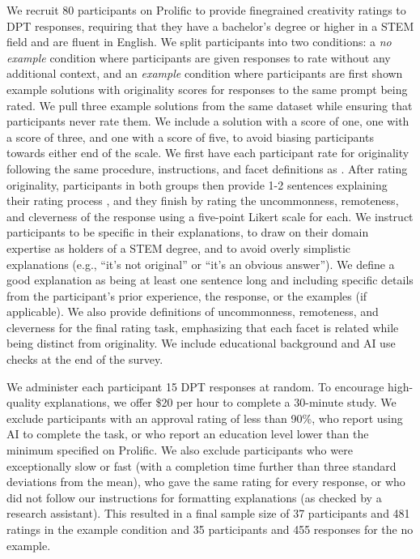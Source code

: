 We recruit 80 participants on Prolific to provide finegrained creativity ratings to DPT responses, requiring that they have a bachelor's degree or higher in a STEM field and are fluent in English. We split participants into two conditions: a \textit{no example} condition where participants are given responses to rate without any additional context, and an \textit{example} condition where participants are first shown example solutions with originality scores for responses to the same prompt being rated. We pull three example solutions from the same dataset while ensuring that participants never rate them. We include a solution with a score of one, one with a score of three, and one with a score of five, to avoid biasing participants towards either end of the scale. We first have each participant rate for originality following the same procedure, instructions, and facet definitions as \citet{Patterson2025}. After rating originality, participants in both groups then provide 1-2 sentences explaining their rating process \citep{orwig2024creative}, and they finish by rating the uncommonness, remoteness, and cleverness of the response using a five-point Likert scale for each. We instruct participants to be specific in their explanations, to draw on their domain expertise as holders of a STEM degree, and to avoid overly simplistic explanations (e.g., ``it's not original'' or ``it's an obvious answer''). We define a good explanation as being at least one sentence long and including specific details from the participant's prior experience, the response, or the examples (if applicable). We also provide definitions of uncommonness, remoteness, and cleverness for the final rating task, emphasizing that each facet is related while being distinct from originality. We include educational background and AI use checks at the end of the survey.

We administer each participant 15 DPT responses at random. To encourage high-quality explanations, we offer \$20 per hour to complete a 30-minute study. We exclude participants with an approval rating of less than 90\%, who report using AI to complete the task, or who report an education level lower than the minimum specified on Prolific. We also exclude participants who were exceptionally slow or fast (with a completion time further than three standard deviations from the mean), who gave the same rating for every response, or who did not follow our instructions for formatting explanations (as checked by a research assistant). This resulted in a final sample size of 37 participants and 481 ratings in the example condition and 35 participants and 455 responses for the no example.

